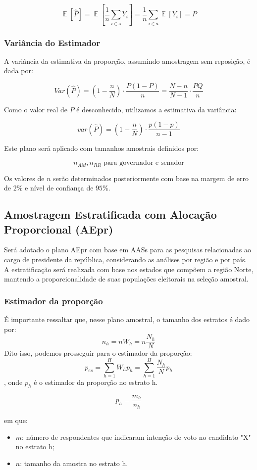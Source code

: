 \documentclass{article}
\DeclareMathOperator{\E}{\mathbb{E}}
\begin{document}
\[
\E[\hat{P}] = \E\left[\frac{1}{n}\sum_{i \in \mathbf{s}} Y_i\right] = \frac{1}{n} \sum_{i \in \mathbf{s}} \E[Y_i] = P
\]

\subsubsection*{Variância do Estimador}

A variância da estimativa da proporção, assumindo amostragem sem reposição, é dada por:

\[
Var(\hat{P}) = \left(1 - \frac{n}{N}\right) \cdot \frac{P(1 - P)}{n} = \frac{N - n}{N - 1} \cdot \frac{PQ}{n}
\]

Como o valor real de $P$ é desconhecido, utilizamos a estimativa da variância:

\[
var(\hat{P}) = \left(1 - \frac{n}{N} \right) \cdot \frac{p(1 - p)}{n - 1}
\]

Este plano será aplicado com tamanhos amostrais definidos por:

\[
n_{AM}, n_{RR} \text{ para governador e senador}
\]

Os valores de $n$ serão determinados posteriormente com base na margem de erro de $2\%$ e nível de confiança de $95\%$.

\subsection*{Amostragem Estratificada com Alocação Proporcional (AEpr)}

Será adotado o plano AEpr com base em AASs para as pesquisas relacionadas ao cargo de presidente da república, considerando as análises por região e por país. A estratificação será realizada com base nos estados que compõem a região Norte, mantendo a proporcionalidade de suas populações eleitorais na seleção amostral.

\subsubsection*{Estimador da proporção}
É importante ressaltar que, nesse plano amostral, o tamanho dos estratos é dado por:
\[
n_h = nW_h = n\frac{N_h}{N}
\]
Dito isso, podemos prosseguir para o estimador da proporção:
\[
p_{es} = \sum_{h=1}^H W_h p_h = \sum_{h=1}^H \frac{N_h}{N}p_h
\], onde $p_h$ é o estimador da proporção no estrato h.

\[
p_h = \frac{m_h}{n_h}
\]

em que:
\begin{itemize}
    \item $m$: número de respondentes que indicaram intenção de voto no candidato "X" no estrato h;
    \item $n$: tamanho da amostra no estrato h.
\end{itemize}
\end{document}

